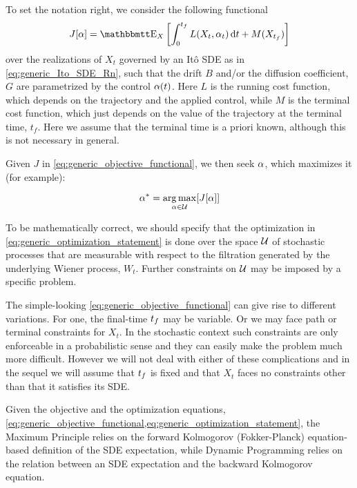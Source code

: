 To set the notation right, we consider the following functional
\begin{equation}
J[\alpha] = \Exp_X \left[ \int_0^\tf L(X_t, \a_t) \intd{t} + M(X_\tf) \right]
\label{eq:generic_objective_functional} 
\end{equation} 
over the realizations of $X_t$ governed by an It\^o SDE as in
\cref{eq:generic_Ito_SDE_Rn}, such that the drift $B$ and/or the diffusion
coefficient, $G$ are parametrized by the control $\alpha(t)$. Here $L$ is the
running cost function, which depends on the trajectory and the applied control,
while $M$ is the terminal cost function, which just depends on the value of the
trajectory at the terminal time, $t_f$. Here we assume that the terminal time is
a priori known, although this is not necessary in general. 

Given $J$ in \cref{eq:generic_objective_functional}, we then seek $\alpha$, which
maximizes it (for example): 

\begin{equation}
\a^* = \argmax_{\a \in \Udomain} [ J[\a] ]
\label{eq:generic_optimization_statement}
\end{equation} 

To be mathematically correct, we should specify that the optimization in
\cref{eq:generic_optimization_statement} is done over the space ${ \mathcal{U} }$ of
stochastic processes that are measurable with respect to the filtration
generated by the underlying Wiener process, $W_t$. Further constraints on
${ \mathcal{U} }$ may be imposed by a specific problem.

The simple-looking \cref{eq:generic_objective_functional} can give rise to
different variations. For one, the final-time ${ t_f }$ may be variable. Or we may
face path or terminal constraints for $X_t$. In the stochastic context such
constraints are only enforceable in a probabilistic sense and they can easily
make the problem much more difficult. However we will not deal with either of
these complications and in the sequel we will assume that ${ t_f }$ is fixed and
that $X_t$ faces no constraints other than that it satisfies its SDE.

Given the objective and the optimization equations,
\cref{eq:generic_objective_functional,eq:generic_optimization_statement}, the
Maximum Principle relies on the forward Kolmogorov (Fokker-Planck)
equation-based definition of the SDE expectation, while Dynamic Programming
relies on the relation between an SDE expectation and the backward Kolmogorov
equation.



